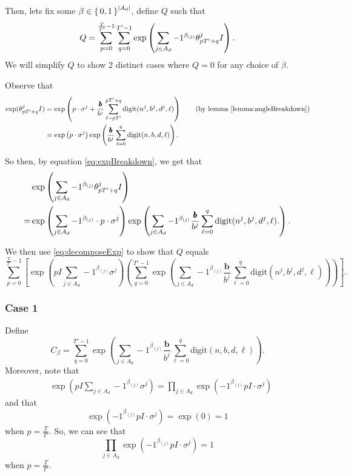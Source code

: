 \documentclass[11pt,titlepage]{article}
\newcommand{\rationalPeriodTotal}{{T}'}
\newcommand{\seedAngle}[1]{{\theta^j_{#1}}}
\newcommand{\totalPeriod}{T}
\newcommand{\digSumPeriodic}{\sigma^j}
\newcommand{\commonBase}{\pmb{b}}
\newcommand{\numbToCommon}{\frac{\commonBase}{b^j}}
\begin{document}
Then, lets fix some $\beta \in \set{0, 1}^{|A_d|}$, define $Q$ such that
\begin{equation}
\label{eq:wts01}  
  Q = \eqWTSInnerProd.
\end{equation}
We will simplify $Q$ to show 2 distinct cases where $Q = 0$ for any choice of $\beta$.

Observe that 
\begin{align}
  \exp(\seedAngle{p \rationalPeriodTotal + q}I)
  &= \exp\left(p \cdot \digSumPeriodic +
    \numbToCommon \sum_{\ell = p \rationalPeriodTotal}^{p \rationalPeriodTotal + q}\mathrm{digit}(n^j, b^j, d^j, \ell)\right) \tag{by lemma \ref{lemma:angleBreakdown}} \\
    \label{eq:expBreakdown}
    &= \exp\left(p \cdot \digSumPeriodic\right) \exp\left(\numbToCommon \sum_{\ell = 0}^{q}\mathrm{digit}(n, b, d, \ell)\right).
\end{align}

So then, by equation \eqref{eq:expBreakdown}, we get that
\begin{align}
&\exp\left(
    \sum_{j \in A_d} -1 ^ {\beta_{(j)}}
    \seedAngle{p \rationalPeriodTotal + q}I
\right)\notag \\ 
\label{eq:decomposeExp}
=&
\exp\left(
    \sum_{j \in A_d} -1 ^ {\beta_{(j)}}
    \cdot p \cdot
    \digSumPeriodic
\right)
\exp\left(
    \sum_{j \in A_d} -1 ^ {\beta_{(j)}} \numbToCommon
      \sum_{\ell = 0}^{q}\mathrm{digit}(n^j, b^j, d^j, \ell).
\right).
\end{align}

We then use \eqref{eq:decomposeExp} to show that $Q$ equals
\begin{equation}
\label{eq:inner-outer-split}
  \sum_{p= 0}^{\frac{\totalPeriod}{\rationalPeriodTotal} - 1} \left[
    \exp\left(
      pI \sum_{j \in A_d} -1 ^ {\beta_{(j)}}
      \digSumPeriodic
    \right)
  \left(
  \sum_{q = 0}^{\rationalPeriodTotal - 1}
    \exp\left(
        \sum_{j \in A_d} -1 ^ {\beta_{(j)}} \numbToCommon
          \sum_{\ell = 0}^{q}\mathrm{digit}(n^j, b^j, d^j, \ell)
    \right)\right)\right].
\end{equation}

\subsubsection*{Case 1}
Define
$$
  C_\beta = \sum_{q = 0}^{\rationalPeriodTotal - 1}
  \exp\left(
      \sum_{j \in A_d} -1 ^ {\beta_{(j)}} \numbToCommon
        \sum_{\ell = 0}^{q}\mathrm{digit}(n, b, d, \ell)
  \right).
$$
Moreover, note that 
\begin{align*}
  &\exp\left(
      pI \sum_{j \in A_d} -1 ^ {\beta_{(j)}}
      \digSumPeriodic
    \right)
  = \prod_{j \in A_d} \exp\left(-1^{\beta_{(j)}} pI \cdot \digSumPeriodic \right)
\end{align*}
and that 
\begin{equation*}
  \exp\left(-1^{\beta_{(j)}} pI \cdot \digSumPeriodic \right) = \exp\left(0\right) = 1
\end{equation*}
when $p = \frac{\totalPeriod}{\rationalPeriodTotal}$. So, we can see that
$$
\prod_{j \in A_d} \exp\left(-1^{\beta_{(j)}} pI \cdot \digSumPeriodic \right) = 1
$$
when $p = \frac{\totalPeriod}{\rationalPeriodTotal}$.
\end{document}
